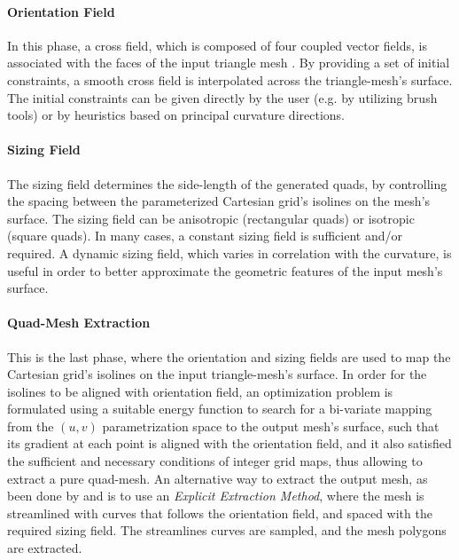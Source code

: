 \paragraph{Orientation Field} In this phase, a cross field, which is composed of four coupled vector fields, is associated with the faces of the input triangle mesh \cite{10.1145/1356682.1356683}. By providing a set of initial constraints, a smooth cross field is interpolated across the triangle-mesh's surface. The initial constraints can be given directly by the user (e.g. by utilizing brush tools) or by heuristics based on principal curvature directions.

\paragraph{Sizing Field} The sizing field determines the side-length of the generated quads, by controlling the spacing between the parameterized Cartesian grid's isolines on the mesh's surface. The sizing field can be anisotropic (rectangular quads) or isotropic (square quads). In many cases, a constant sizing field is sufficient and/or required. A dynamic sizing field, which varies in correlation with the curvature, is useful in order to better approximate the geometric features of the input mesh's surface.

\paragraph{Quad-Mesh Extraction} This is the last phase, where the orientation and sizing fields are used to map the Cartesian grid's isolines on the input triangle-mesh's surface. In order for the isolines to be aligned with orientation field, an optimization problem is formulated using a suitable energy function to search for a bi-variate mapping from the $\left(u,v\right)$ parametrization space to the output mesh's surface, such that its gradient at each point is aligned with the orientation field, and it also satisfied the sufficient and necessary conditions of integer grid maps, thus allowing to extract a pure quad-mesh. An alternative way to extract the output mesh, as been done by \cite{10.1145/882262.882296} and \cite{10.5555/1025128.1026044} is to use an \emph{Explicit Extraction Method}, where the mesh is streamlined with curves that follows the orientation field, and spaced with the required sizing field. The streamlines curves are sampled, and the mesh polygons are extracted.

